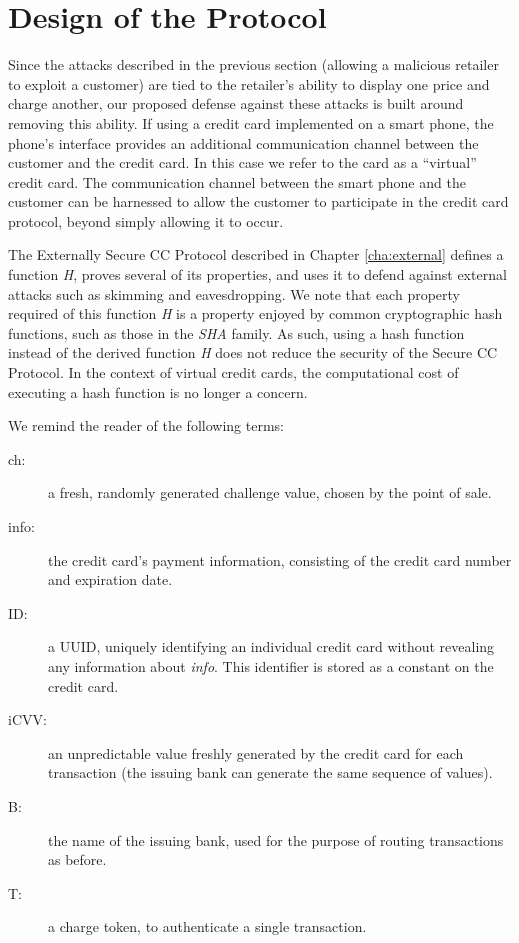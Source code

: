 \section{Design of the Protocol}
\label{sec:secure-design}

Since the attacks described in the previous section (allowing a malicious retailer to exploit a customer)
	are tied to the retailer's ability to display one price and charge another,
	our proposed defense against these attacks is built around removing this ability.
If using a credit card implemented on a smart phone, the phone's interface provides an additional communication channel between the customer and the credit card.
In this case we refer to the card as a ``virtual'' credit card.
The communication channel between the smart phone and the customer can be harnessed to allow the customer to participate in the credit card protocol,
	beyond simply allowing it to occur.

The Externally Secure CC Protocol described in Chapter \ref{cha:external} defines a function \emph{H},
    proves several of its properties, and uses it to defend against external attacks such as skimming and eavesdropping.
We note that each property required of this function \emph{H} is a property enjoyed by common cryptographic hash functions,
    such as those in the \emph{SHA} family.
As such, using a hash function instead of the derived function \emph{H} does not reduce the security of the Secure CC Protocol.
In the context of virtual credit cards, the computational cost of executing a hash function is no longer a concern.

We remind the reader of the following terms:

\begin{description}
\item[ch:] a fresh, randomly generated challenge value, chosen by the point of sale.
\item[info:] the credit card's payment information, consisting of the credit card number and expiration date.
\item[ID:] a UUID, uniquely identifying an individual credit card without revealing any information about \emph{info}.
	This identifier is stored as a constant on the credit card.
\item[iCVV:] an unpredictable value freshly generated by the credit card for each transaction (the issuing bank can generate the same sequence of values).
\item[B:] the name of the issuing bank, used for the purpose of routing transactions as before.
\item[T:] a charge token, to authenticate a single transaction.
\end{description}

